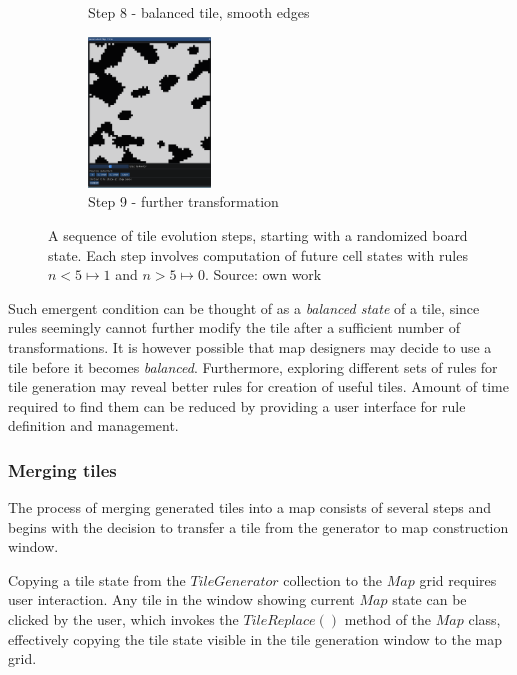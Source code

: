 \documentclass[12pt]{report}
\begin{document}
\begin{figure}[H]
\begin{subfigure}[t]{0.3\textwidth}
		\caption{Step 8 - balanced tile, smooth edges} 
	\end{subfigure} \hspace{1em} 
	\begin{subfigure}[t]{0.3\textwidth}
		\centering
		\includegraphics[height=4cm]{images/s_9}
		\caption{Step 9 - further transformation} 
	\end{subfigure} \hspace{1em} 
	\label{fig:gensteps}
	\caption{A sequence of tile evolution steps, starting with a randomized board state. Each step involves computation of future cell states with rules $ n < 5 \mapsto 1$ and $n > 5 \mapsto 0$. Source: own work} 
\end{figure}

Such emergent condition can be thought of as a \textit{balanced state} of a tile, since rules seemingly cannot further modify the tile after a sufficient number of transformations. It is however possible that map designers may decide to use a tile before it becomes \textit{balanced}. Furthermore, exploring different sets of rules for tile generation may reveal better rules for creation of useful tiles. Amount of time required to find them can be reduced by providing a user interface for rule definition and management.

\subsubsection{Merging tiles}
 
The process of merging generated tiles into a map consists of several steps and begins with the decision to transfer a tile from the generator to map construction window.

Copying a tile state from the $TileGenerator$ collection to the $Map$ grid requires user interaction. Any tile in the window showing current $Map$ state can be clicked by the user, which invokes the $TileReplace()$ method of the $Map$ class, effectively copying the tile state visible in the tile generation window to the map grid. 
\end{document}
